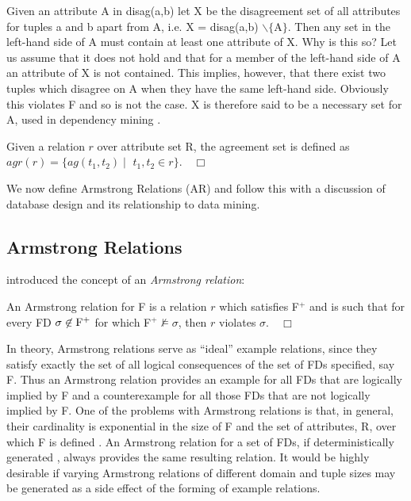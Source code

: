 Given an attribute A in disag(a,b) let X be the disagreement set of all
attributes for tuples a and b apart from A, i.e. X = disag(a,b) $\backslash \{$A$\}$.  
Then any set in the left-hand side of A must contain at least one
attribute of X. Why is this so?  Let us assume that it does not hold and
that for a member of the left-hand side of A an attribute of X is not
contained.  This implies, however, that there exist two tuples which disagree
on A when they have the same left-hand side.  Obviously this violates F and so is
not the case. X is therefore said to be a necessary set for A, used in
dependency mining \cite{Mann92}.

\begin{definition}
\begin{rm}
Given a relation $r$ over attribute set R, the agreement set is defined as
$agr(r) = \{ ag(t_1,t_2) \mid$ $t_1,t_2 \in r \}$.$\quad\Box$
\end{rm}
\end{definition}


We now define Armstrong Relations (AR) and
follow this with a discussion of database design and its relationship
to data mining.

\subsection{Armstrong Relations}


\cite{Arms74} introduced the concept of an {\em Armstrong relation}:  

\begin{definition}\label{def:AR}
\begin{rm}
An Armstrong relation for F is a relation $r$ which satisfies F$^+$
and is such
that for every FD $\sigma \not\in {\rm F}^+$ for which  F$^+ \not\models
\sigma$, then $r$ violates $\sigma$.$\quad\Box$
\end{rm}
\end{definition}

In theory, Armstrong relations \cite{fag82,bdfs84,dt95,gl90,lev95,mr86}
serve as ``ideal'' example relations, since they satisfy exactly the set of
all logical consequences of the set of FDs specified, say F.
Thus an Armstrong relation provides an example for all FDs
that are logically implied by F and a counterexample for all 
those FDs that are not logically implied by F.
One of the problems with Armstrong relations is that, in general,
their cardinality is exponential in the size of F and the set of attributes, R,
over which F is defined \cite{bdfs84}. An Armstrong relation for a
set of FDs, if
deterministically generated \cite{Mann92}, always provides
the same resulting relation. It would be highly desirable if varying Armstrong relations
of different domain and tuple sizes may be generated as a side effect of 
the forming of example relations.

